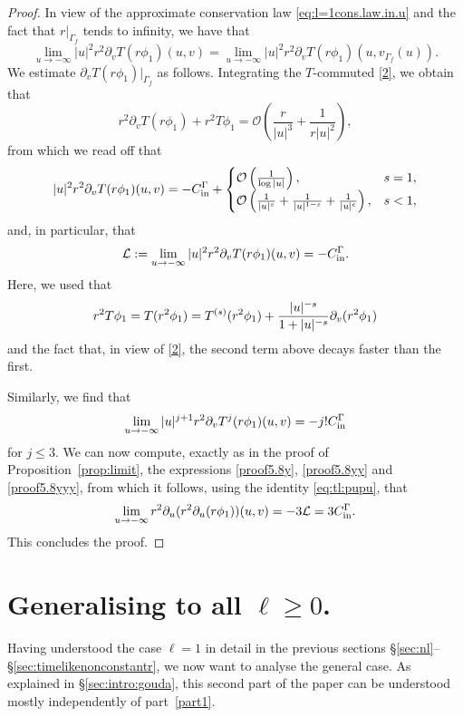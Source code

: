 \documentclass[11pt,english]{article}
\numberwithin{equation}{section}
\theoremstyle{remark}
\theoremstyle{plain}
\theoremstyle{remark}
\newcommand{\pu}{\partial_u}
\newcommand{\pv}{\partial_v}
\renewcommand{\(}{\left(}
\renewcommand{\)}{\right)}
\begin{document}
\begin{proof}
In view of the approximate conservation law \eqref{eq:l=1cons.law.in.u} and the fact that $r|_{\Gamma_f}$ tends to infinity, we have that
\begin{equation}
\lim_{u\to-\infty}|u|^2r^2\pv T(r\phi_1)(u,v)=\lim_{u\to-\infty}|u|^2r^2\pv T(r\phi_1)(u,v_{\Gamma_f}(u)).
\end{equation}
We estimate $\pv T(r\phi_1)|_{\Gamma_f}$ as follows. Integrating the $T$-commuted \eqref{2}, we obtain that
\begin{equation}
r^2\pv T(r\phi_1)+r^2T \phi_1=\mathcal{O}\left(\frac{r}{|u|^3}+\frac{1}{r|u|^2}\right),
\end{equation}
from which we read off that
\begin{equation}
|u|^2r^2\pv T(r\phi_1)(u,v)=-\cin+\begin{cases} \mathcal{O}\left(\frac{1}{\log |u|}\right),&s=1,\\
												\mathcal{O}\left(\frac{1}{|u|^{s}}+\frac{1}{|u|^{1-s}}+\frac{1}{|u|^{\epsilon}}\right),& s<1,
\end{cases}
\end{equation}
and, in particular, that 
\begin{align}
\mathcal{L}:=\lim_{u\to-\infty}|u|^2r^2\pv T(r\phi_1)(u,v)=-\cin.
\end{align}
Here, we used that 
\begin{align*}
r^2T\phi_1=T(r^2\phi_1)=\te(r^2\phi_1)+\frac{|u|^{-s}}{1+|u|^{-s}}\pv (r^2\phi_1)
\end{align*}
and the fact that, in view of \eqref{2}, the second term above decays faster than the first.

Similarly, we find that
\begin{align}
\lim_{u\to-\infty}|u|^{j+1}r^2\pv T^j(r\phi_1)(u,v)=-j!\cin
\end{align}
for $j\leq 3$.
We can now compute, exactly as in the proof of Proposition~\ref{prop:limit}, the expressions \eqref{proof5.8y}, \eqref{proof5.8yy} and \eqref{proof5.8yyy}, from which it follows, using the identity \eqref{eq:tl:pupu}, that
\begin{equation}
\lim_{u\to-\infty}r^2\pu(r^2\pu(r\phi_1))(u,v)=-3\mathcal{L}=3\cin.
\end{equation}
This concludes the proof.
\end{proof}







\newpage
\part{Generalising to all \texorpdfstring{$\ell\geq 0$}{L}.}\label{part2}
Having understood the case $\ell=1$ in detail in the previous sections \S \ref{sec:nl}--\S \ref{sec:timelikenonconstantr}, we now want to analyse the general case. As explained in \S\ref{sec:intro:gouda}, this second part of the paper can be understood mostly independently of part~\ref{part1}.
\end{document}
